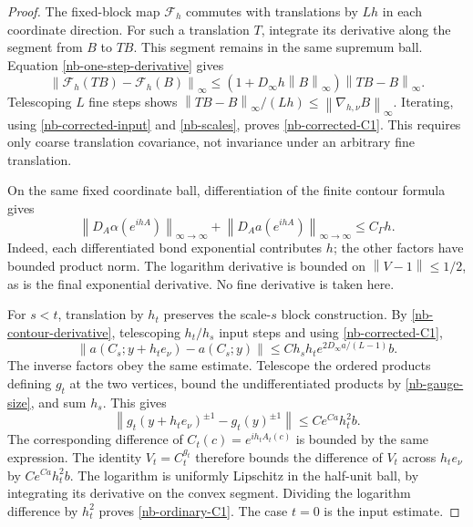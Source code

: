 \documentclass[11pt]{article}
\theoremstyle{remark}
\newcommand{\norm}[1]{\left\|#1\right\|}
\begin{document}
\begin{proof}
The fixed-block map $\mathcal F_h$ commutes with translations
by $Lh$ in each coordinate direction. For such a translation
$T$, integrate its derivative along the segment from $B$ to
$TB$. This segment remains in the same supremum ball. Equation
\eqref{nb-one-step-derivative} gives
\[
 \norm{\mathcal F_h(TB)-\mathcal F_h(B)}_\infty
  \le(1+D_\infty h\norm{B}_\infty)\norm{TB-B}_\infty.
\]
Telescoping $L$ fine steps shows
$\norm{TB-B}_\infty/(Lh)\le
\norm{\nabla_{h,\nu}B}_\infty$. Iterating, using
\eqref{nb-corrected-input} and \eqref{nb-scales}, proves
\eqref{nb-corrected-C1}. This requires only coarse translation
covariance, not invariance under an arbitrary fine translation.

On the same fixed coordinate ball, differentiation of the
finite contour formula gives
\begin{equation}\label{nb-contour-derivative}
 \norm{D_A\alpha(e^{ihA})}_{\infty\to\infty}
 +\norm{D_Aa(e^{ihA})}_{\infty\to\infty}\le C_\Gamma h.
\end{equation}
Indeed, each differentiated bond exponential contributes $h$;
the other factors have bounded product norm. The logarithm
derivative is bounded on $\norm{V-1}\le1/2$, as is the final
exponential derivative. No fine derivative is taken here.

For $s<t$, translation by $h_t$ preserves the scale-$s$ block
construction. By \eqref{nb-contour-derivative}, telescoping
$h_t/h_s$ input steps and using \eqref{nb-corrected-C1},
\begin{equation}\label{nb-endpoint-spatial-difference}
 \norm{a(C_s;y+h_te_\nu)-a(C_s;y)}
        \le C h_sh_t e^{2D_\infty a/(L-1)}b.
\end{equation}
The inverse factors obey the same estimate. Telescope the
ordered products defining $g_t$ at the two vertices, bound the
undifferentiated products by \eqref{nb-gauge-size}, and sum
$h_s$. This gives
\begin{equation}\label{nb-gauge-spatial-difference}
 \norm{g_t(y+h_te_\nu)^{\pm1}-g_t(y)^{\pm1}}
                         \le C e^{Ca}h_t^2b.
\end{equation}
The corresponding difference of $C_t(c)=e^{ih_tA_t(c)}$
is bounded by the same expression. The identity $V_t=C_t^{g_t}$
therefore bounds the difference of $V_t$ across $h_te_\nu$
by $Ce^{Ca}h_t^2b$. The logarithm is uniformly Lipschitz in
the half-unit ball, by integrating its derivative on the convex
segment. Dividing the logarithm difference by $h_t^2$ proves
\eqref{nb-ordinary-C1}. The case $t=0$ is the input estimate.


\end{proof}
\end{document}
